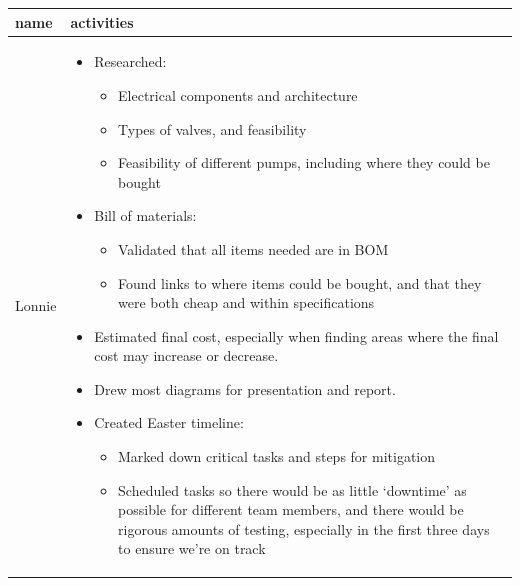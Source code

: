 \documentclass[10pt, a4paper]{article}
\begin{document}
\begin{table}[H]
    \footnotesize
    \centering
    \begin{tabularx}{\linewidth}{>{\raggedright\arraybackslash}p{1cm} X}
        \toprule
        \textbf{name} & \textbf{activities}                                                                                                                                                                                                        \\

        \midrule
        Lonnie        & \begin{itemize}[nosep, leftmargin=*]
                            \item Researched:
                                  \begin{itemize}[nosep, leftmargin=*]
                      \item Electrical components and architecture
                      \item Types of valves, and feasibility
                      \item Feasibility of different pumps, including where they could be bought
                  \end{itemize}
                            \item Bill of materials:
                                  \begin{itemize}[nosep, leftmargin=*]
                      \item Validated that all items needed are in BOM
                      \item Found links to where items could be bought, and that they were both cheap and within specifications
                  \end{itemize}
                            \item Estimated final cost, especially when finding areas where the final cost may increase or decrease.
                            \item Drew most diagrams for presentation and report.
                            \item Created Easter timeline:
                                  \begin{itemize}[nosep, leftmargin=*]
                      \item Marked down critical tasks and steps for mitigation
                      \item Scheduled tasks so there would be as little `downtime' as possible for different team members, and there would be rigorous amounts of testing, especially in the first three days to ensure we're on track
                  \end{itemize}
                        \end{itemize}                                                                                                                    \\


\end{tabularx}
\end{table}
\end{document}
